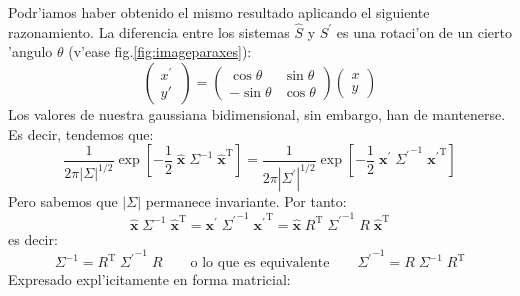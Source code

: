 Podr'iamos haber obtenido el mismo resultado aplicando el siguiente
razonamiento. La diferencia entre los sistemas $\hat{S}$ y $S^\prime$ es una
rotaci'on de un cierto 'angulo $\theta$ (v'ease
fig.\ref{fig:imageparaxes}):
%
\begin{equation}
  \label{eq:rot}
  \begin{pmatrix}
    x^\prime\\ y'\ 
  \end{pmatrix} =
  \begin{pmatrix}
    \cos\theta & \sin\theta \\ -\sin\theta & \cos\theta
  \end{pmatrix}
  \begin{pmatrix}
    x \\ y
  \end{pmatrix}
\end{equation}
%
Los valores de nuestra gaussiana bidimensional, sin embargo, han de
mantenerse. Es decir, tendemos que:
%
\begin{equation}
  \label{eq:equalz}
  \frac{1}{2\pi|\Sigma|^{1/2}} 
  \exp\left[ -\frac{1}{2} \;
    \hat{\mathbf{x}} \; \Sigma^{-1} \; \hat{\mathbf{x}}^{\mathrm{T}}
  \right]
  =
  \frac{1}{2\pi|\Sigma^\prime|^{1/2}} 
  \exp\left[ -\frac{1}{2} \;
    {\mathbf{x}^\prime} \; {\Sigma^\prime}^{-1} \; {\mathbf{x}^\prime}^{\mathrm{T}}
  \right]  
\end{equation}
%
Pero sabemos que $|\Sigma|$ permanece invariante. Por tanto:
%
\begin{equation}
  \label{eq:equalzvec}
  \hat{\mathbf{x}} \; \Sigma^{-1} \; \hat{\mathbf{x}}^{\mathrm{T}} =
  {\mathbf{x}^\prime} \; {\Sigma^\prime}^{-1} \; {\mathbf{x}^\prime}^{\mathrm{T}} =
  \hat{\mathbf{x}} \; R^{\mathrm{T}} \; 
  {\Sigma^\prime}^{-1} \; R \; \hat{\mathbf{x}}^{\mathrm{T}}
\end{equation}
%
es decir:
%
\begin{equation}
  \label{eq:equalmat}
  \Sigma^{-1} = R^{\mathrm{T}} \; {\Sigma^\prime}^{-1} \; R 
  \qquad \text{o lo que es equivalente} \qquad
  {\Sigma^\prime}^{-1} = R \; \Sigma^{-1} \; R^{\mathrm{T}} 
\end{equation}
%
Expresado expl'icitamente en forma matricial:
%

